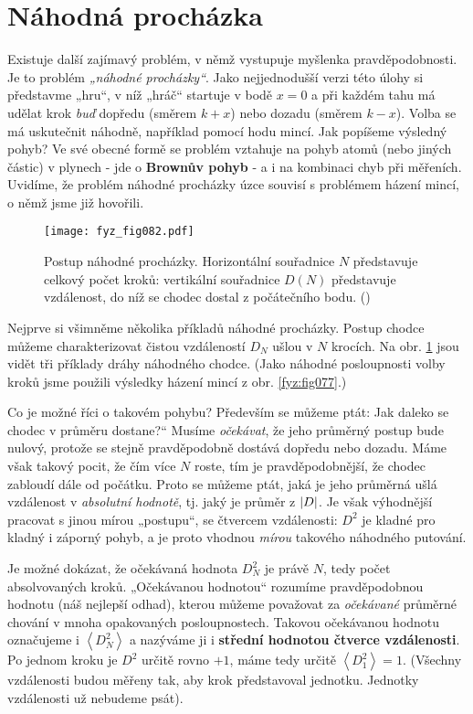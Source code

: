   \section{Náhodná procházka}
    Existuje další zajímavý problém, v němž vystupuje myšlenka pravděpodobnosti. Je to problém 
    \emph{„náhodné procházky“}. Jako nejjednodušší verzi této úlohy si představme „hru“, v níž 
    „hráč“ startuje v bodě \(x = 0\) a při každém tahu má udělat krok \emph{buď} dopředu (směrem 
    \(k + x\)) nebo dozadu (směrem \(k - x\)). Volba se má uskutečnit náhodně, například pomocí 
    hodu mincí. Jak popíšeme výsledný pohyb? Ve své obecné formě se problém vztahuje na pohyb atomů 
    (nebo jiných částic) v plynech - jde o \textbf{Brownův pohyb} - a i na kombinaci chyb při 
    měřeních. Uvidíme, že problém náhodné procházky úzce souvisí s problémem házení mincí, o němž 
    jsme již hovořili.

    \begin{figure}[ht!]  %
      \centering
      \texttt{[image: fyz\_fig082.pdf]}
      \caption{Postup náhodné procházky. Horizontální souřadnice \(N\) představuje celkový počet 
               kroků: vertikální souřadnice \(D(N)\) představuje vzdálenost, do níž se chodec 
               dostal z počátečního bodu. (\cite[s.~83]{Feynman01})}
      \label{fyz:fig082}
    \end{figure}
    
    Nejprve si všimněme několika příkladů náhodné procházky. Postup chodce můžeme charakterizovat 
    čistou vzdáleností \(D_N\) ušlou v \(N\) krocích. Na obr. \ref{fyz:fig082} jsou vidět tři 
    příklady dráhy náhodného chodce. (Jako náhodné posloupnosti volby kroků jsme použili výsledky 
    házení mincí z obr. \ref{fyz:fig077}.)
    
    Co je možné říci o takovém pohybu? Především se můžeme ptát: Jak daleko se chodec v průměru 
    dostane?“ Musíme \emph{očekávat}, že jeho průměrný postup bude nulový, protože se stejně 
    pravděpodobně dostává dopředu nebo dozadu. Máme však takový pocit, že čím více \(N\) roste, tím 
    je pravděpodobnější, že chodec zabloudí dále od počátku. Proto se můžeme ptát, jaká je jeho 
    průměrná ušlá vzdálenost v \emph{absolutní hodnotě}, tj. jaký je průměr z \(\left\lvert D\right\rvert\). Je však 
    výhodnější pracovat s jinou mírou „postupu“, se čtvercem vzdálenosti: \(D^2\) je kladné pro 
    kladný i záporný pohyb, a je proto vhodnou \emph{mírou} takového náhodného putování.
    
    Je možné dokázat, že očekávaná hodnota \(D_N^2\) je právě \(N\), tedy počet absolvovaných 
    kroků. „Očekávanou hodnotou“ rozumíme pravděpodobnou hodnotu (náš nejlepší odhad), kterou 
    můžeme považovat za \emph{očekávané} průměrné chování v mnoha opakovaných posloupnostech. 
    Takovou očekávanou hodnotu označujeme i \(\left\langle D_N^2\right\rangle\) a nazýváme ji i 
    \textbf{střední hodnotou čtverce vzdálenosti}. Po jednom kroku je \(D^2\) určitě rovno \(+1\), 
    máme tedy určitě \(\left\langle D_1^2\right\rangle = 1\). (Všechny vzdálenosti budou měřeny 
    tak, aby krok představoval jednotku. Jednotky vzdálenosti už nebudeme psát).

